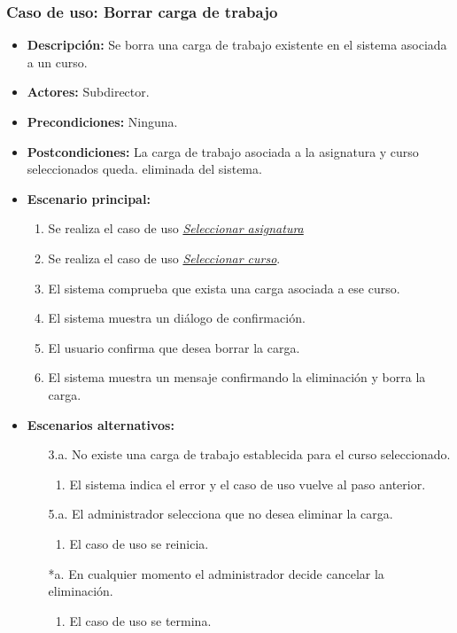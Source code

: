 \documentclass{book}
\begin{document}

\subsubsection*{Caso de uso: Borrar carga de trabajo}
\begin{itemize}
\item{\bf Descripción:} Se borra una carga de trabajo existente en el sistema asociada a un curso.
\item{\bf Actores:} Subdirector.
\item{\bf Precondiciones:} Ninguna.
\item{\bf Postcondiciones:} La carga de trabajo asociada a la asignatura y curso seleccionados queda. eliminada del sistema.
\item{\bf Escenario principal:}
	\begin{enumerate}
	\item Se realiza el caso de uso {\em \hyperref[select_asignatura]{Seleccionar asignatura}}
	\item Se realiza el caso de uso {\em \hyperref[select_curso]{Seleccionar curso}}.
	\item El sistema comprueba que exista una carga asociada a ese curso.
	\item El sistema muestra un diálogo de confirmación.
	\item El usuario confirma que desea borrar la carga.
	\item El sistema muestra un mensaje confirmando la eliminación y borra la carga.
	\end{enumerate}
\item{\bf Escenarios alternativos:}
	\begin{itemize}
	\item[3.a.] No existe una carga de trabajo establecida para el curso seleccionado.
	  \begin{enumerate}
	  \item El sistema indica el error y el caso de uso vuelve al paso anterior.
	  \end{enumerate}
	\item[5.a.] El administrador selecciona que no desea eliminar la carga.
		\begin{enumerate}
		\item El caso de uso se reinicia.
		\end{enumerate}
	\item[*a.] En cualquier momento el administrador decide cancelar la eliminación.
		\begin{enumerate}
		\item El caso de uso se termina.
		\end{enumerate}
	\end{itemize}
\end{itemize}
\end{document}
